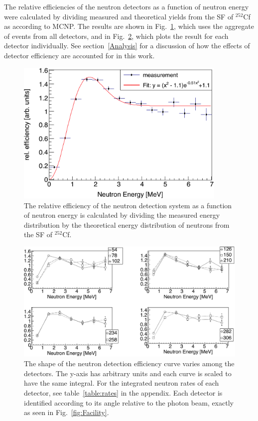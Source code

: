 The relative efficiencies of the neutron detectors as a function of neutron energy were calculated by dividing measured and theoretical yields from the SF of $^{252}$Cf as according to MCNP.
The results are shown in Fig.~\ref{fig:RelErgEfficiency}, which uses the aggregate of events from all detectors, and in Fig.~\ref{fig:RelErgEfficiencyVariation}, which plots the result for each detector individually.
See section~\ref{Analysis} for a discussion of how the effects of detector efficiency are accounted for in this work.
\begin{figure}[]
    \centering
    \includegraphics[width = 0.9\textwidth]{Content/Methods/RelErgEfficiency.png}
    \caption{The relative efficiency of the neutron detection system as a function of neutron energy is calculated by dividing the measured energy distribution by the theoretical energy distribution of neutrons from the SF of $^{252}$Cf.}
    \label{fig:RelErgEfficiency}
\end{figure}
\begin{figure}[]
    \centering
    \includegraphics[width = 1\textwidth]{Content/Methods/RelErgEfficiencyVariation.png}
    \caption{
    The shape of the neutron detection efficiency curve varies among the detectors.
    The y-axis has arbitrary units and each curve is scaled to have the same integral.
    For the integrated neutron rates of each detector, see table~\ref{table:rates} in the appendix.
    Each detector is identified according to its angle relative to the photon beam, exactly as seen in Fig.~\ref{fig:Facility}.
    }
    \label{fig:RelErgEfficiencyVariation}
\end{figure}

